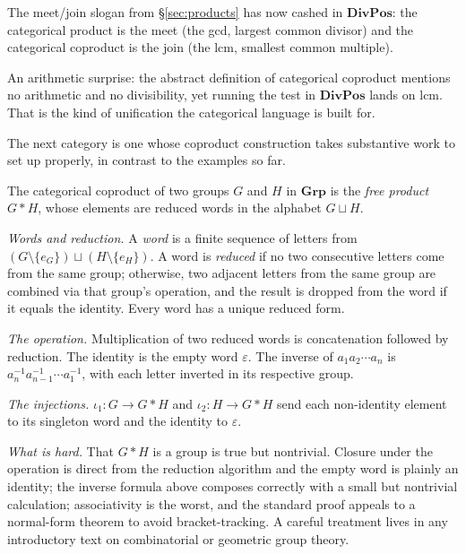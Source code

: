 \noindent The meet/join slogan from \S\ref{sec:products} has
now cashed in $\mathbf{DivPos}$: the categorical product is the
meet (the gcd, largest common divisor) and the categorical
coproduct is the join (the lcm, smallest common multiple).

\noindent An arithmetic surprise: the abstract definition of
categorical coproduct mentions no arithmetic and no
divisibility, yet running the test in $\mathbf{DivPos}$ lands
on lcm. That is the kind of unification the categorical
language is built for.

\noindent The next category is one whose coproduct construction
takes substantive work to set up properly, in contrast to the
examples so far.

\begin{example}\label{ex:grp-coproduct}
The categorical coproduct of two groups $G$ and $H$ in
$\mathbf{Grp}$ is the \textit{free
product} $G * H$, whose elements are
reduced words in the alphabet $G \sqcup H$.

\textit{Words and reduction.} A \textit{word} is a finite
sequence of letters from
$(G \setminus \{e_G\}) \sqcup (H \setminus \{e_H\})$. A word is
\textit{reduced} if no two consecutive letters come from the
same group; otherwise, two adjacent letters from the same group
are combined via that group's operation, and the result is
dropped from the word if it equals the identity. Every word has
a unique reduced form.

\textit{The operation.} Multiplication of two reduced words is
concatenation followed by reduction. The identity is the empty
word $\varepsilon$. The inverse of $a_1 a_2 \cdots a_n$ is
$a_n^{-1} a_{n-1}^{-1} \cdots a_1^{-1}$, with each letter
inverted in its respective group.

\textit{The injections.} $\iota_1 : G \to G * H$ and
$\iota_2 : H \to G * H$ send each non-identity element to its
singleton word and the identity to $\varepsilon$.

\textit{What is hard.} That $G * H$ is a group is true but
nontrivial. Closure under the operation is direct from the
reduction algorithm and the empty word is plainly an identity;
the inverse formula above composes correctly with a small but
nontrivial calculation; associativity is the worst, and the
standard proof appeals to a normal-form theorem to avoid
bracket-tracking. A careful treatment lives in any
introductory text on combinatorial or geometric group theory.


\end{example}
